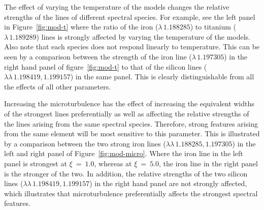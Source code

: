 The effect of varying the temperature of the models changes the relative strengths of the lines of different spectral species.
For example, see the left panel in Figure~\ref{fig:mod-t} where the ratio of the iron
($\lambda\,1.188285$) to titanium ($\lambda\,1.189289$) lines is strongly affected by varying the temperature of the models.
Also note that each species does not respond linearly to temperature.
This can be seen by a comparison between the strength of the iron line
($\lambda\,1.197305$) in the right hand panel of figure~\ref{fig:mod-t} to that of the silicon lines
($\lambda\lambda\,1.198419, 1.199157$) in the same panel.
This is clearly distinguishable from all the effects of all other parameters.


Increasing the microturbulence has the effect of increasing the equivalent widths
of the strongest lines preferentially as well as affecting the relative strengths of the lines arising from the same spectral species.
Therefore, strong features arising from the same element will be most sensitive to this
parameter.
This is illustrated by a comparison between the two strong iron lines
($\lambda\lambda\,1.188285, 1.197305$) in the left and
right panel of Figure~\ref{fig:mod-micro}.
Where the iron line in the left panel is strongest at $\xi~=~1.0$,
whereas at $\xi~=~5.0$, the iron line in the right panel is the stronger of the two.
In addition, the relative strengths of the two silicon lines
($\lambda\lambda\,1.198419, 1.199157$) in the right hand panel are not strongly affected, which illustrates that microturbulence preferentially affects the strongest spectral features.

